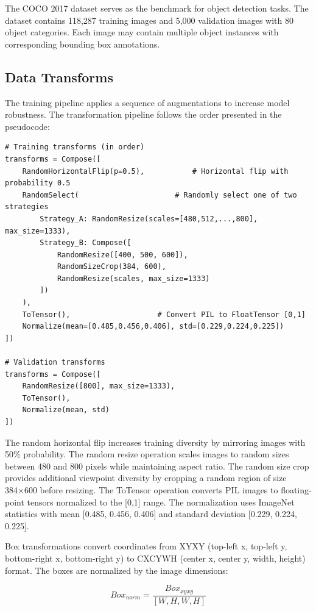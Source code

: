 \documentclass[12pt,a4paper]{article}
\begin{document}
The COCO 2017 dataset serves as the benchmark for object detection tasks. The dataset contains 118,287 training images and 5,000 validation images with 80 object categories. Each image may contain multiple object instances with corresponding bounding box annotations.

\subsection{Data Transforms}

The training pipeline applies a sequence of augmentations to increase model robustness. The transformation pipeline follows the order presented in the pseudocode:

\begin{verbatim}
# Training transforms (in order)
transforms = Compose([
    RandomHorizontalFlip(p=0.5),           # Horizontal flip with probability 0.5
    RandomSelect(                      # Randomly select one of two strategies
        Strategy_A: RandomResize(scales=[480,512,...,800], max_size=1333),
        Strategy_B: Compose([
            RandomResize([400, 500, 600]),
            RandomSizeCrop(384, 600),
            RandomResize(scales, max_size=1333)
        ])
    ),
    ToTensor(),                    # Convert PIL to FloatTensor [0,1]
    Normalize(mean=[0.485,0.456,0.406], std=[0.229,0.224,0.225])
])

# Validation transforms
transforms = Compose([
    RandomResize([800], max_size=1333),
    ToTensor(),
    Normalize(mean, std)
])
\end{verbatim}

The random horizontal flip increases training diversity by mirroring images with 50\% probability. The random resize operation scales images to random sizes between 480 and 800 pixels while maintaining aspect ratio. The random size crop provides additional viewpoint diversity by cropping a random region of size 384×600 before resizing. The ToTensor operation converts PIL images to floating-point tensors normalized to the [0,1] range. The normalization uses ImageNet statistics with mean [0.485, 0.456, 0.406] and standard deviation [0.229, 0.224, 0.225].

Box transformations convert coordinates from XYXY (top-left x, top-left y, bottom-right x, bottom-right y) to CXCYWH (center x, center y, width, height) format. The boxes are normalized by the image dimensions:

\begin{equation}
Box_{norm} = \frac{Box_{xyxy}}{[W, H, W, H]}
\end{equation}
\end{document}
